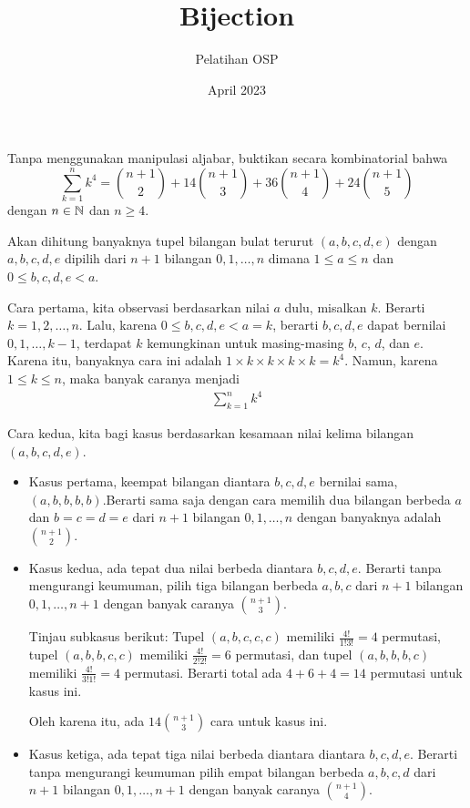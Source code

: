 \documentclass[11pt]{scrartcl}
\title{Bijection}
\author{Pelatihan OSP}
\date{April 2023}
\begin{document}
\maketitle
\begin{soaljawab}
    Tanpa menggunakan manipulasi aljabar, buktikan secara kombinatorial bahwa
    $$\sum_{k=1}^{n} k^4 = {n+1 \choose 2} + 14{n+1 \choose 3}+36{n+1 \choose 4}+24{n+1 \choose 5}$$ dengan $n\in \mathbb N$ dan $n \ge 4$.
    \begin{solusi}
        Akan dihitung banyaknya tupel bilangan bulat terurut $(a,b,c,d,e)$ dengan $a,b,c,d,e$ dipilih dari $n+1$ bilangan $0,1,\dots,n$ dimana $1 \le a \le n$ dan $0 \le b,c,d,e < a$.
		
	Cara pertama, kita observasi berdasarkan nilai $a$ dulu, misalkan $k$. Berarti $k=1,2,\dots,n$. Lalu, karena $0 \le b,c,d,e < a=k$, berarti $b,c,d,e$ dapat bernilai $0,1,\dots,k-1$, terdapat $k$ kemungkinan untuk masing-masing $b$, $c$, $d$, dan $e$. Karena itu, banyaknya cara ini adalah $1 \times k \times k \times k \times k = k^4$. Namun, karena $1 \le k \le n$, maka banyak caranya menjadi
		\begin{align*}
		\sum_{k=1}^{n} k^4
		\end{align*}
		
	Cara kedua, kita bagi kasus berdasarkan kesamaan nilai kelima bilangan $(a,b,c,d,e)$.
		\begin{itemize}
		\item Kasus pertama, keempat bilangan diantara $b,c,d,e$ bernilai sama, $(a,b,b,b,b)$.Berarti sama saja dengan cara memilih dua bilangan berbeda $a$ dan $b=c=d=e$ dari $n+1$ bilangan $0,1,\dots,n$ dengan banyaknya adalah ${n+1 \choose 2}$.
		
		\item Kasus kedua, ada tepat dua nilai berbeda diantara $b,c,d,e$. Berarti tanpa mengurangi keumuman, pilih tiga bilangan berbeda $a,b,c$ dari $n+1$ bilangan $0,1,\dots,n+1$ dengan banyak caranya ${n+1 \choose 3}$.
		
		Tinjau subkasus berikut: Tupel $(a,b,c,c,c)$ memiliki $\frac{4!}{1!3!} = 4$ permutasi, tupel $(a,b,b,c,c)$ memiliki $\frac{4!}{2!2!}=6$ permutasi, dan tupel $(a,b,b,b,c)$ memiliki $\frac{4!}{3!1!}=4$ permutasi. Berarti total ada $4+6+4=14$ permutasi untuk kasus ini.
		
		Oleh karena itu, ada $14{n+1 \choose 3}$ cara untuk kasus ini.
		
		\item Kasus ketiga, ada tepat tiga nilai berbeda diantara diantara $b,c,d,e$. Berarti tanpa mengurangi keumuman pilih empat bilangan berbeda $a,b,c,d$ dari $n+1$ bilangan $0,1,\dots,n+1$ dengan banyak caranya ${n+1 \choose 4}$.
				

\end{itemize}
\end{solusi}
\end{soaljawab}
\end{document}

